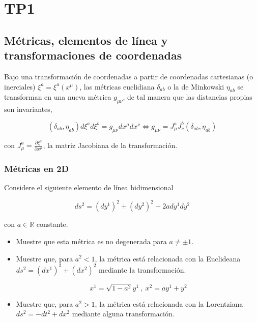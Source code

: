 \section{TP1}
\subsection{M\'etricas, elementos de l\'inea y transformaciones de coordenadas}

Bajo una transformaci\'on de coordenadas a partir de coordenadas cartesianas (o inerciales) $\xi^{a} = \xi^{a}(x^{\mu})$, las m\'etricas euclidiana $\delta_{ab}$ o la de Minkowski $\eta_{ab}$ se transforman en una nueva
m\'etrica $g_{\mu \nu}$, de tal manera que las distancias propias son invariantes,

\begin{equation}
    (\delta_{ab}, \eta_{ab})d\xi^{a}d\xi^{b} = g_{\mu \nu}dx^{\mu}dx^{\nu} \iff g_{\mu \nu} = J_{\mu}^{a}J_{\nu}^{b}(\delta_{ab}, \eta_{ab})
    \label{eq1}
\end{equation}

con $J_{\mu}^{a} = \frac{\partial \xi^{a}}{\partial x^{\mu}}$, la matriz Jacobiana de la transformaci\'on.\\

\subsubsection{M\'etricas en 2D}

Considere el siguiente elemento de l\'inea bidimensional

\begin{equation}
    ds^{2} = (dy^{1})^{2} + (dy^{2})^{2} + 2ady^{1}dy^{2}
    \label{eq2}
\end{equation}

con $a \in \mathbb{R}$ constante.

\begin{itemize}
    \item Muestre que esta m\'etrica es no degenerada para $a \neq \pm 1$.
    \item Muestre que, para $a^{2} < 1$, la m\'etrica est\'a relacionada con la Euclideana $ds^{2} = (dx^{1})^{2} + (dx^{2})^{2}$ mediante la transformaci\'on.

    \begin{equation}
        x^{1} = \sqrt{1 - a^{2}}y^{1} \ , \ x^{2} = ay^{1} + y^{2}
        \label{eq3}
    \end{equation}

    \item Muestre que, para $a^{2} > 1$, la m\'etrica est\'a relacionada con la Lorentziana $ds^{2} = -dt^{2} + dx^{2}$ mediante alguna transformaci\'on.
\end{itemize}

